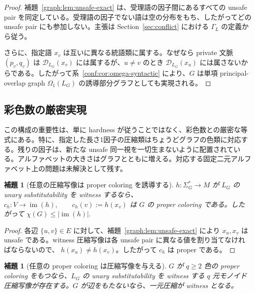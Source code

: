 \documentclass[10pt,a4paper]{ltjsarticle}
\newtheorem{lemma}[theorem]{補題}
\theoremstyle{definition}
\theoremstyle{remark}
\newcommand{\D}{\mathcal D}
\newcommand{\Om}{\Omega}
\begin{document}
\begin{proof}
補題~\ref{graph:lem:unsafe-exact} は、受理語の因子間にあるすべての unsafe pair を同定している。受理語の因子でない語は空の分布をもち、したがってどの unsafe pair にも参加しない。主張は Section~\ref{sec:conflict} における \(\Gamma_L\) の定義から従う。

さらに、指定語 $x_v$ は互いに異なる統語類に属する。なぜなら private 文脈 $(p_v,q_v)$ は
\(\D_{L_G}(x_v)\)
には属するが、$u\ne v$ のとき
\(\D_{L_G}(x_u)\)
には属さないからである。したがって系~\ref{conf:cor:omega-syntactic} により、$G$ は単項 principal-overlap graph \(\Om_1(L_G)\) の誘導部分グラフとしても実現される。
\end{proof}

\subsection{彩色数の厳密実現}

この構成の重要性は、単に hardness が従うことではなく、彩色数との厳密な等式にある。特に、指定した長さ1因子の圧縮類はちょうどグラフの色類に対応する。残りの因子は、新たな unsafe 同一視を一切生まないように配置されている。アルファベットの大きさはグラフとともに増える。対応する固定二元アルファベット上の問題は未解決として残す。

\begin{lemma}[任意の圧縮写像は proper coloring を誘導する]
\label{graph:lem:lower-coloring}
\(h:\Sigma_G^*\to M\)
が \(L_G\) の unary substitutability を witness するなら、
\(c_h:V\to\operatorname{im}(h), \qquad c_h(v):=h(x_v)\)
は $G$ の proper coloring である。したがって
\(
\chi(G)\le|\operatorname{im}(h)|.
\)
\end{lemma}

\begin{proof}
各辺 \(\{u,v\}\in E\) に対して、補題~\ref{graph:lem:unsafe-exact} により $x_u,x_v$ は unsafe である。witness 圧縮写像は各 unsafe pair に異なる値を割り当てなければならないので、
$h(x_u)\neq h(x_v)$。したがって $c_h$ は proper である。
\end{proof}

\begin{lemma}[任意の proper coloring は圧縮写像を与える]
\label{graph:lem:upper-coloring}
$G$ が $q\ge2$ 色の proper coloring をもつなら、$L_G$ の unary substitutability を witness する $q$ 元モノイド圧縮写像が存在する。$G$ が辺をもたないなら、一元圧縮が witness となる。
\end{lemma}
\end{document}
